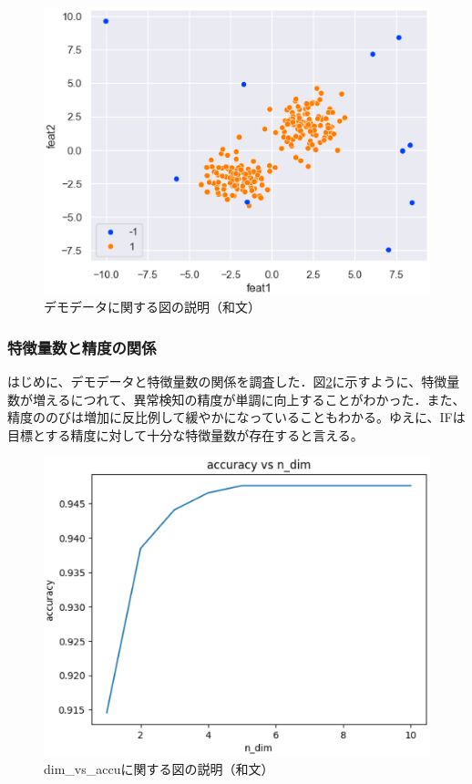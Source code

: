 \documentclass{css}
\begin{document}
\begin{figure}[tb]
    \centering
    \includegraphics[width=\linewidth]{pictures/eps/demodata.eps}
    \caption{デモデータに関する図の説明（和文）}
    \label{fig:demodata}
\end{figure}

\subsubsection{特徴量数と精度の関係}
はじめに、デモデータと特徴量数の関係を調査した．図\ref{fig:dim_vs_accu}に示すように、特徴量数が増えるにつれて、異常検知の精度が単調に向上することがわかった．また、精度ののびは増加に反比例して緩やかになっていることもわかる。ゆえに、IFは目標とする精度に対して十分な特徴量数が存在すると言える。

\begin{figure}[tb]
    \centering
    \includegraphics[width=\linewidth]{pictures/eps/dim_vs_accu.eps}
    \caption{dim\_vs\_accuに関する図の説明（和文）}
    \label{fig:dim_vs_accu}
\end{figure}
\end{document}
